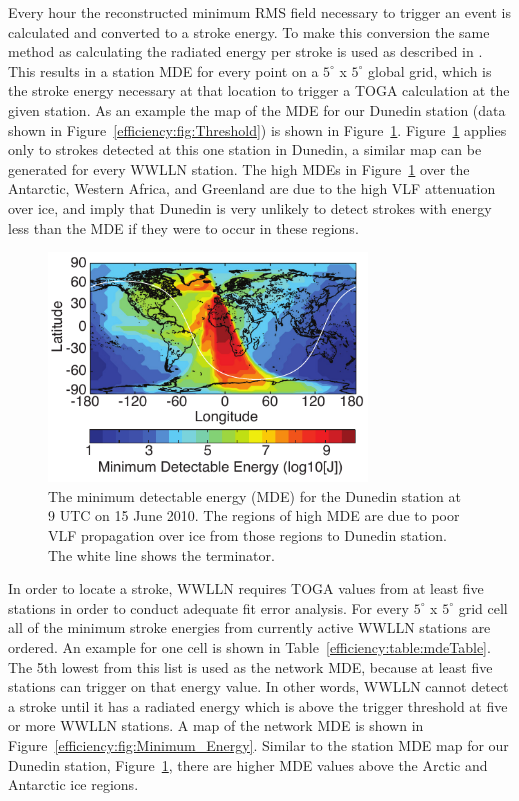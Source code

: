 Every hour the reconstructed minimum RMS field necessary to trigger an event is calculated and converted to a stroke energy.
To make this conversion the same method as calculating the radiated energy per stroke is used as described in \citet{Hutchins2012}.
This results in a station MDE for every point on a $5^\circ$ x $5^\circ$ global grid, which is the stroke energy necessary at that location to trigger a TOGA calculation at the given station.
As an example the map of the MDE for our Dunedin station (data shown in Figure~\ref{efficiency:fig:Threshold}) is shown in Figure~\ref{efficiency:fig:Threshold_Map}.
Figure~\ref{efficiency:fig:Threshold_Map} applies only to strokes detected at this one station in Dunedin, a similar map can be generated for every WWLLN station.
The high MDEs in Figure~\ref{efficiency:fig:Threshold_Map} over the Antarctic, Western Africa, and Greenland are due to the high VLF attenuation over ice, and imply that Dunedin is very unlikely to detect strokes with energy less than the MDE if they were to occur in these regions.

\begin{figure}[ht!]
   \centering
\noindent\includegraphics[width=20pc]{efficiency/Figures/2012RS005049-p3.pdf}
   \caption{The minimum detectable energy (MDE) for the Dunedin station at 9 UTC on 15 June 2010.
The regions of high MDE are due to poor VLF propagation over ice from those regions to Dunedin station.
The white line shows the terminator.}
   \label{efficiency:fig:Threshold_Map}
\end{figure}

In order to locate a stroke, WWLLN requires TOGA values from at least five stations in order to conduct adequate fit error analysis.
For every $5^\circ$ x $5^\circ$ grid cell all of the minimum stroke energies from currently active WWLLN stations are ordered.
An example for one cell is shown in Table~\ref{efficiency:table:mdeTable}.
The 5th lowest from this list is used as the network MDE, because at least five stations can trigger on that energy value.
In other words, WWLLN cannot detect a stroke until it has a radiated energy which is above the trigger threshold at five or more WWLLN stations.
A map of the network MDE is shown in Figure~\ref{efficiency:fig:Minimum_Energy}.
Similar to the station MDE map for our Dunedin station, Figure~\ref{efficiency:fig:Threshold_Map}, there are higher MDE values above the Arctic and Antarctic ice regions.

